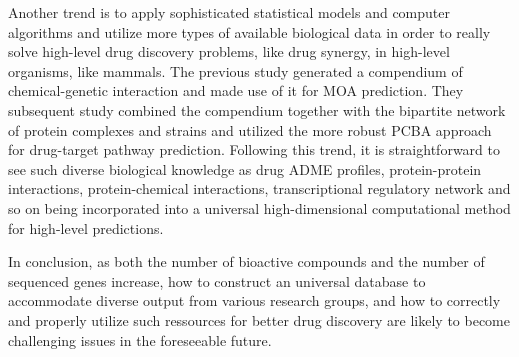 \documentclass[12pt,conference,compsocconf]{../IEEEtran}
\begin{document}
Another trend is to apply sophisticated statistical models and computer algorithms and utilize more types of available biological data in order to really solve high-level drug discovery problems, like drug synergy, in high-level organisms, like mammals. The previous study \citep{1078}  generated a compendium of chemical-genetic interaction and made use of it for MOA prediction. They subsequent study \citep{1079} combined the compendium together with the bipartite network of protein complexes and strains and utilized the more robust PCBA approach for drug-target pathway prediction. Following this trend, it is straightforward to see such diverse biological knowledge as drug ADME profiles, protein-protein interactions, protein-chemical interactions, transcriptional regulatory network and so on being incorporated into a universal high-dimensional computational method for high-level predictions.

In conclusion, as both the number of bioactive compounds and the number of sequenced genes increase, how to construct an universal database to accommodate diverse output from various research groups, and how to correctly and properly utilize such ressources for better drug discovery are likely to become challenging issues in the foreseeable future.



\end{document}
